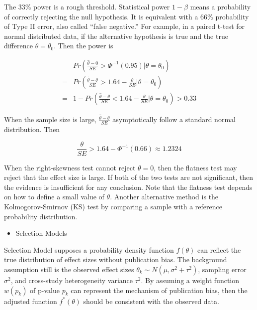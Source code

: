 \documentclass[
  11pt,
  openany]{memoir}
\providecommand{\tightlist}{%
  \setlength{\itemsep}{0pt}\setlength{\parskip}{0pt}}
\begin{document}
The 33\% power is a rough threshold. Statistical power \(1-\beta\) means a probability of correctly rejecting the null hypothesis. It is equivalent with a 66\% probability of Type II error, also called ``false negative.''
For example, in a paired t-test for normal distributed data, if the alternative hypothesis is true and the true difference \(\theta=\theta_0\). Then the power is

\begin{equation}
\begin{split}
&Pr(\frac{\hat\theta-0}{SE}>\Phi^{-1}(0.95)|\theta=\theta_0)\\
=&Pr(\frac{\hat\theta-\theta}{SE}>1.64-\frac{\theta}{SE}|\theta=\theta_0)\\
=&1-Pr(\frac{\hat\theta-\theta}{SE}<1.64-\frac{\theta}{SE}|\theta=\theta_0)>0.33
\end{split}
\label{eq:33power}
\end{equation}

When the sample size is large, \(\frac{\hat\theta-\theta}{SE}\) asymptotically follow a standard normal distribution. Then

\begin{equation}
\frac{\theta}{SE}>1.64-\Phi^{-1}(0.66)\approx 1.2324
\end{equation}

When the right-skewness test cannot reject \(\theta=0\), then the flatness test may reject that the effect size is large. If both of the two tests are not significant, then the evidence is insufficient for any conclusion.
Note that the flatness test depends on how to define a small value of \(\theta\).
Another alternative method is the Kolmogorov-Smirnov (KS) test by comparing a sample with a reference probability distribution.

\begin{itemize}
\tightlist
\item
  Selection Models
\end{itemize}

Selection Model supposes a probability density function \(f(\theta)\) can reflect the true distribution of effect sizes without publication bias.
The background assumption still is the observed effect sizes \(\theta_k \sim N(\mu,\sigma^2+\tau^2)\), sampling error \(\sigma^2\), and cross-study heterogeneity variance \(\tau^2\).
By assuming a weight function \(w(p_k)\) of p-value \(p_k\) can represent the mechanism of publication bias, then the adjusted function \(f^*(\theta)\) should be consistent with the observed data.
\end{document}

